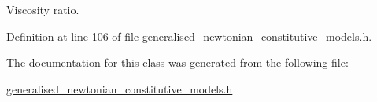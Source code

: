 Viscosity ratio. 



Definition at line 106 of file generalised\+\_\+newtonian\+\_\+constitutive\+\_\+models.\+h.



The documentation for this class was generated from the following file\+:\begin{DoxyCompactItemize}
\item 
\hyperlink{generalised__newtonian__constitutive__models_8h}{generalised\+\_\+newtonian\+\_\+constitutive\+\_\+models.\+h}\end{DoxyCompactItemize}
